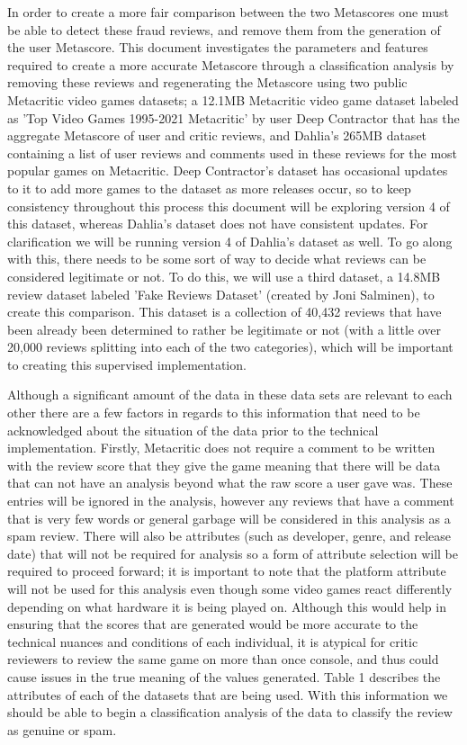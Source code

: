 \documentclass{article}
\begin{document}
\par In order to create a more fair comparison between the two Metascores one must be able to detect these fraud reviews, and remove them from the generation of the user Metascore. This document investigates the parameters and features required to create a more accurate Metascore through a classification analysis by removing these reviews and regenerating the Metascore using two public Metacritic video games datasets; a 12.1MB Metacritic video game dataset labeled as 'Top Video Games 1995-2021 Metacritic' by user Deep Contractor that has the aggregate Metascore of user and critic reviews, and Dahlia's 265MB dataset containing a list of user reviews and comments used in these reviews for the most popular games on Metacritic. Deep Contractor's dataset has occasional updates to it to add more games to the dataset as more releases occur, so to keep consistency throughout this process this document will be exploring version 4 of this dataset, whereas Dahlia's dataset does not have consistent updates. For clarification we will be running version 4 of Dahlia's dataset as well. To go along with this, there needs to be some sort of way to decide what reviews can be considered legitimate or not. To do this, we will use a third dataset, a 14.8MB review dataset labeled 'Fake Reviews Dataset' (created by Joni Salminen), to create this comparison. This dataset is a collection of 40,432 reviews that have been already been determined to rather be legitimate or not (with a little over 20,000 reviews splitting into each of the two categories), which will be important to creating this supervised implementation. \\
\par Although a significant amount of the data in these data sets are relevant to each other there are a few factors in regards to this information that need to be acknowledged about the situation of the data prior to the technical implementation. Firstly, Metacritic does not require a comment to be written with the review score that they give the game meaning that there will be data that can not have an analysis beyond what the raw score a user gave was. These entries will be ignored in the analysis, however any reviews that have a comment that is very few words or general garbage will be considered in this analysis as a spam review. There will also be attributes (such as developer, genre, and release date) that will not be required for analysis so a form of attribute selection will be required to proceed forward; it is important to note that the platform attribute will not be used for this analysis even though some video games react differently depending on what hardware it is being played on. Although this would help in ensuring that the scores that are generated would be more accurate to the technical nuances and conditions of each individual, it is atypical for critic reviewers to review the same game on more than once console, and thus could cause issues in the true meaning of the values generated. Table 1 describes the attributes of each of the datasets that are being used. With this information we should be able to begin a classification analysis of the data to classify the review as genuine or spam.
\end{document}
